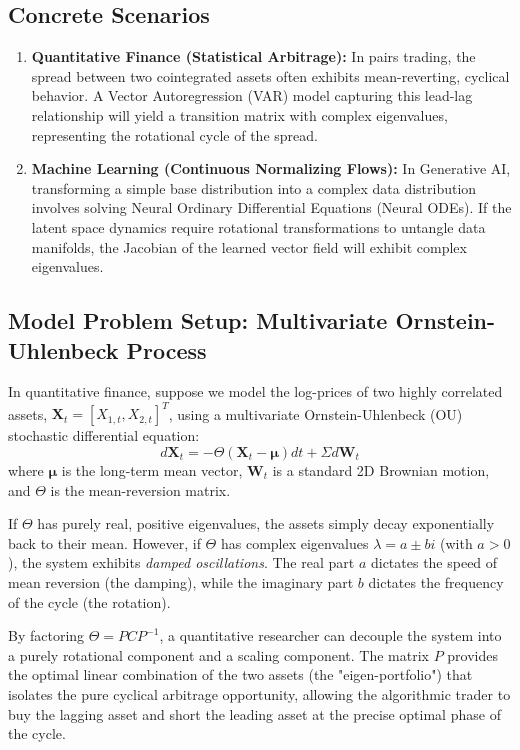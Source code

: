 \documentclass[11pt, letterpaper]{article}
\theoremstyle{definition}
\theoremstyle{remark}
\begin{document}
\subsection{Concrete Scenarios}
\begin{enumerate}
    \item \textbf{Quantitative Finance (Statistical Arbitrage):} In pairs trading, the spread between two cointegrated assets often exhibits mean-reverting, cyclical behavior. A Vector Autoregression (VAR) model capturing this lead-lag relationship will yield a transition matrix with complex eigenvalues, representing the rotational cycle of the spread.
    \item \textbf{Machine Learning (Continuous Normalizing Flows):} In Generative AI, transforming a simple base distribution into a complex data distribution involves solving Neural Ordinary Differential Equations (Neural ODEs). If the latent space dynamics require rotational transformations to untangle data manifolds, the Jacobian of the learned vector field will exhibit complex eigenvalues.
\end{enumerate}

\subsection{Model Problem Setup: Multivariate Ornstein-Uhlenbeck Process}
In quantitative finance, suppose we model the log-prices of two highly correlated assets, $\mathbf{X}_t = [X_{1,t}, X_{2,t}]^T$, using a multivariate Ornstein-Uhlenbeck (OU) stochastic differential equation:
\[
d\mathbf{X}_t = -\Theta (\mathbf{X}_t - \boldsymbol{\mu})dt + \Sigma d\mathbf{W}_t
\]
where $\boldsymbol{\mu}$ is the long-term mean vector, $\mathbf{W}_t$ is a standard 2D Brownian motion, and $\Theta$ is the mean-reversion matrix. 

If $\Theta$ has purely real, positive eigenvalues, the assets simply decay exponentially back to their mean. However, if $\Theta$ has complex eigenvalues $\lambda = a \pm bi$ (with $a > 0$), the system exhibits \textit{damped oscillations}. The real part $a$ dictates the speed of mean reversion (the damping), while the imaginary part $b$ dictates the frequency of the cycle (the rotation). 

By factoring $\Theta = PCP^{-1}$, a quantitative researcher can decouple the system into a purely rotational component and a scaling component. The matrix $P$ provides the optimal linear combination of the two assets (the "eigen-portfolio") that isolates the pure cyclical arbitrage opportunity, allowing the algorithmic trader to buy the lagging asset and short the leading asset at the precise optimal phase of the cycle.
\end{document}
